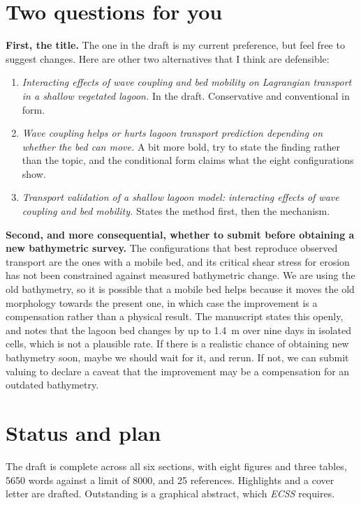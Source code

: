 \documentclass[11pt]{article}
\begin{document}
\section{Two questions for you}

\textbf{First, the title.} The one in the draft is my current preference, but
feel free to suggest changes. Here are other two alternatives that I think are defensible:

\begin{enumerate}[leftmargin=1.4em, itemsep=0.3em]
  \item \emph{Interacting effects of wave coupling and bed mobility on
  Lagrangian transport in a shallow vegetated lagoon.} In the draft.
  Conservative and conventional in form.
  \item \emph{Wave coupling helps or hurts lagoon transport prediction depending
  on whether the bed can move.} A bit more bold, try to state the finding rather than the topic, and
  the conditional form claims what the eight configurations show.
  \item \emph{Transport validation of a shallow lagoon model: interacting
  effects of wave coupling and bed mobility.} States the method first, then the mechanism.
\end{enumerate}

\textbf{Second, and more consequential, whether to submit before obtaining a new
bathymetric survey.} The configurations that best reproduce observed transport
are the ones with a mobile bed, and its critical shear stress for erosion has
not been constrained against measured bathymetric change. We are using the old
bathymetry, so it is possible that a mobile bed helps because it moves the old
morphology towards the present one, in which case the improvement is a
compensation rather than a physical result. The manuscript states this openly,
and notes that the lagoon bed changes by up to 1.4~m over nine days in isolated
cells, which is not a plausible rate. If there is a realistic chance of
obtaining new bathymetry soon, maybe we should wait for it, and rerun. 
If not, we can submit valuing to declare a caveat that the improvement may be a compensation 
for an outdated bathymetry.

\section{Status and plan}

The draft is complete across all six sections, with eight figures and three
tables, 5650 words against a limit of 8000, and 25 references. Highlights and a
cover letter are drafted. Outstanding is a graphical abstract, which
\textit{ECSS} requires.
\end{document}
